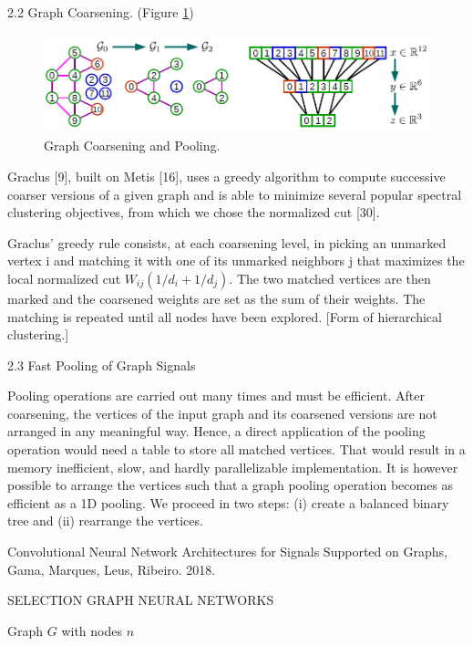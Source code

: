 \documentclass[english]{article}
\begin{document}
\item 2.2 Graph Coarsening. (Figure \ref{gcp})

\begin{figure}
  \centering
  \includegraphics[scale=0.5]{gcp.png}
    \caption{Graph Coarsening and Pooling.}
    \label{gcp}
\end{figure}


Graclus [9], built on Metis [16], uses a greedy algorithm to compute successive coarser versions of a given graph and is able to minimize several popular spectral clustering objectives, from which we chose the normalized cut [30].

Graclus' greedy rule consists, at each coarsening level, in picking an
unmarked vertex i and matching it with one of its unmarked neighbors j that maximizes the local normalized cut $W_{ij} (1/d_i + 1/d_j)$. The two matched vertices are then marked and the coarsened weights are set as the sum of their weights. The matching is repeated until all nodes have been explored.  [Form of hierarchical clustering.]

\item 2.3 Fast Pooling of Graph Signals

Pooling operations are carried out many times and must be efficient. After coarsening, the vertices
of the input graph and its coarsened versions are not arranged in any meaningful way. Hence, a
direct application of the pooling operation would need a table to store all matched vertices. That
would result in a memory inefficient, slow, and hardly parallelizable implementation. It is however
possible to arrange the vertices such that a graph pooling operation becomes as efficient as a 1D
pooling. We proceed in two steps: (i) create a balanced binary tree and (ii) rearrange the vertices.

\eenum 

\item Convolutional Neural Network Architectures for
Signals Supported on Graphs, Gama, Marques, Leus, Ribeiro. 2018.

SELECTION GRAPH NEURAL NETWORKS

Graph $G$ with nodes $n$
\end{document}
